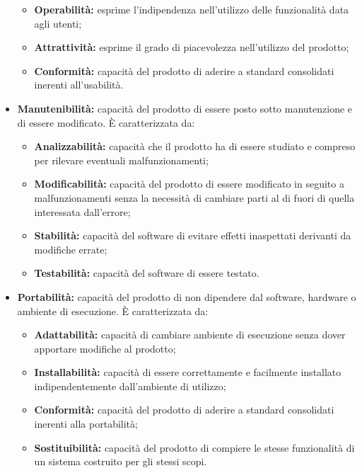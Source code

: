 \begin{itemize}
\begin{itemize}
		\item \textbf{Operabilità:} esprime l'indipendenza nell'utilizzo delle funzionalità data agli utenti;
		\item \textbf{Attrattività:} esprime il grado di piacevolezza nell'utilizzo del prodotto;
		\item \textbf{Conformità:} capacità del prodotto di aderire a standard consolidati inerenti all'usabilità.
	\end{itemize}
	\item \textbf{Manutenibilità:} capacità del prodotto di essere posto sotto manutenzione e di essere modificato. È caratterizzata da:
	\begin{itemize}
		\item \textbf{Analizzabilità:} capacità che il prodotto ha di essere studiato e compreso per rilevare eventuali malfunzionamenti;
		\item \textbf{Modificabilità:} capacità del prodotto di essere modificato in seguito a malfunzionamenti senza la necessità di cambiare parti al di fuori di quella interessata dall'errore;
		\item \textbf{Stabilità:} capacità del software di evitare effetti inaspettati derivanti da modifiche errate;
		\item \textbf{Testabilità:} capacità del software di essere testato.
	\end{itemize}
	\item \textbf{Portabilità:} capacità del prodotto di non dipendere dal software, hardware o ambiente di esecuzione. È caratterizzata da:
	\begin{itemize}
		\item \textbf{Adattabilità:} capacità di cambiare ambiente di esecuzione senza dover apportare modifiche al prodotto;
		\item \textbf{Installabilità:} capacità di essere correttamente e facilmente installato indipendentemente dall'ambiente di utilizzo;
		\item \textbf{Conformità:} capacità del prodotto di aderire a standard consolidati inerenti alla portabilità;
		\item \textbf{Sostituibilità:} capacità del prodotto di compiere le stesse funzionalità di un sistema costruito per gli stessi scopi.
	\end{itemize}
\end{itemize}

